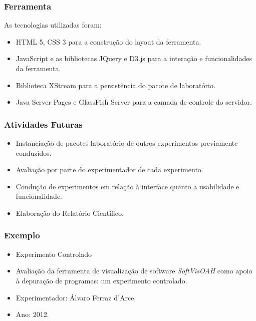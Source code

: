 \documentclass[aspectratio=169]{beamer}
\begin{document}
\begin{frame}
\frametitle{Ferramenta}
\justifying

As tecnologias utilizadas foram: 
\begin{itemize}
\item HTML 5, CSS 3 para a construção do layout da ferramenta.
\item JavaScript e as bibliotecas JQuery e D3.js para a interação e funcionalidades da ferramenta.
\item Biblioteca XStream para a persistência do pacote de laboratório.
\item Java Server Pages e GlassFish Server para a camada de controle do servidor.
\end{itemize}

\end{frame}


\begin{frame}
\frametitle{Atividades Futuras}
\justifying

\begin{itemize}
\item Instanciação de pacotes laboratório de outros experimentos previamente conduzidos. 
\item Avaliação por parte do experimentador de cada experimento.
\item Condução de experimentos em relação à interface quanto a usabilidade e funcionalidade.
\item Elaboração do Relatório Científico.
\end{itemize}


\end{frame}

\begin{frame}
\frametitle{Exemplo}
\justifying

\begin{itemize}
\item Experimento Controlado
\item Avaliação da ferramenta de visualização de software \textit{SoftVisOAH} como apoio à depuração de programas: um experimento controlado.
\item Experimentador: Álvaro Ferraz d’Arce.
\item Ano: 2012.
\end{itemize}


\end{frame}



   
   


\end{document}
